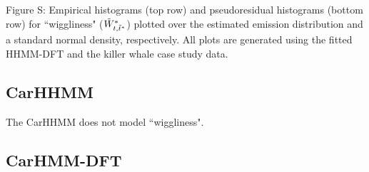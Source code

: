 \documentclass{article}
\begin{document}
        \noindent Figure S: Empirical histograms (top row) and pseudoresidual histograms (bottom row) for ``wiggliness" ($\tilde{W}^*_{t,\tilde t^*}$) plotted over the estimated emission distribution and a standard normal density, respectively. All plots are generated using the fitted HHMM-DFT and the killer whale case study data.
        \addtocounter{fignum}{1}
        
        \subsection{CarHHMM}
        
        The CarHHMM does not model ``wiggliness".
        
        \subsection{CarHMM-DFT}
        
\end{document}
